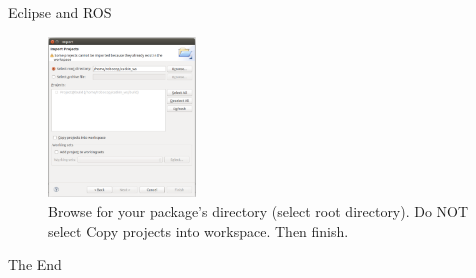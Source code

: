 \documentclass{beamer}
\begin{document}
\begin{frame}{Eclipse and ROS}

\begin{figure}
	\centering
  \includegraphics[width=0.35\textwidth]{file.pdf}
	\caption{Browse for your package's directory (select root directory). Do NOT select Copy projects into workspace. Then finish.}
	\label{fig1}
\end{figure}

\end{frame}
\begin{frame}
\Huge{\centerline{The End}}
\end{frame}
\end{document}
